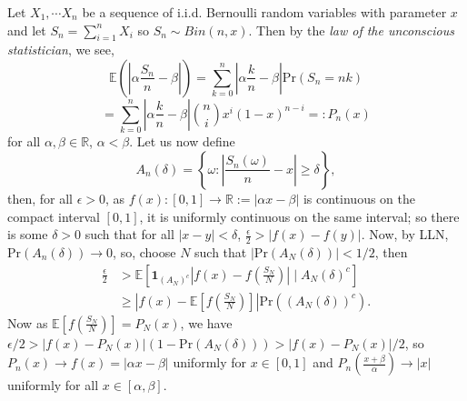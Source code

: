 \documentclass[landscape,final,a0paper]{baposter}
\begin{document}
\begin{poster}
{Let $X_1, \cdots X_n$ be a sequence of i.i.d. Bernoulli random variables with parameter $x$ and let $S_n = \sum_{i= 1}^n X_i$ so $S_n \sim Bin(n, x)$. Then by the \textit{law of the unconscious statistician}, we see, 
$$
\mathbb{E}\left(\left| \alpha \frac{S_n}{n} - \beta \right| \right) = \sum_{k=0}^n \left| \alpha \frac{k}{n} - \beta \right|\text{Pr}\left(S_n = nk\right)
$$ 
\vspace{-3mm}$$
 = \sum_{k=0}^n \left| \alpha \frac{k}{n} - \beta \right| \binom{n}{i} x^i (1 - x)^{n - i} =: P_n(x)
$$
for all $\alpha, \beta \in \mathbb{R}$, $\alpha < \beta$. Let us now define
$$ A_n(\delta) = \left\{\omega : \left| \frac{S_n(\omega)}{n} - x \right| \ge \delta \right\},$$
then, for all $\epsilon > 0$, as $f(x) : [0, 1] \to \mathbb{R} := \left| \alpha x - \beta \right|$ is continuous on the compact interval $[0, 1]$, it is uniformly continuous on the same interval; so there is some $\delta > 0$ such that for all $\left| x - y \right| < \delta$,  $\frac{\epsilon}{2} > \left| f(x) - f(y) \right|$. Now, by LLN, $\text{Pr}(A_n (\delta)) \to 0$, so, choose $N $ such that $\left|\text{Pr}(A_N(\delta)) \right| < 1/2$, then
\begin{align*}
\frac{\epsilon}{2} & > \mathbb{E} \left[ \mathbf{1}_{(A_N)^c}\left| f(x) - f \left(\frac{S_N}{N}\right) \right| \mid A_N(\delta)^c \right] \\
& \ge \left| f(x) - \mathbb{E} \left[f \left(\frac{S_N}{N}\right) \right] \right| \text{Pr}((A_N(\delta))^c).
\end{align*}
Now as $\mathbb{E} \left[f \left(\frac{S_N}{N}\right) \right] = P_N(x)$, we have $\epsilon/ 2 > \left|f(x) - P_N(x)\right| (1 - \text{Pr}(A_N(\delta))) > \left|f(x) - P_N(x)\right|/2$, so $P_n(x) \to f(x) = \left| \alpha x - \beta \right|$ uniformly for $x\in [0,1]$ and $P_n(\frac{x + \beta}{\alpha}) \to \left| x \right|$ uniformly for all $x \in [\alpha, \beta]$.


\vspace{0.3em}
 }

\end{poster}
\end{document}
